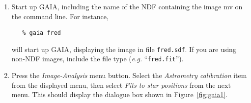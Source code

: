 \documentclass[twoside,11pt]{article}
\newcommand{\latex}[1]{#1}
\newcommand{\html}[1]{}
\renewcommand{\_}{\texttt{\symbol{95}}}
\begin{document}
\begin{enumerate}

\item Start up GAIA, including the name of the NDF containing the image
mv on the command line. For instance, 

\begin{verbatim}
   % gaia fred
\end{verbatim}

will start up GAIA, displaying the image in file \texttt{fred.sdf}. If you 
are using non-NDF images, include the file type (\emph{e.g.} ``\texttt{fred.fit}'').

\item Press the \emph{Image-Analysis} menu button. Select the
\emph{Astrometry calibration} item from the displayed menu, then select 
\emph{Fits to star positions} from the next menu. This should display the
dialogue box shown in \latex{Figure~\ref{fig:gaia1}.} \html{the next figure:}


\end{enumerate}
\end{document}
